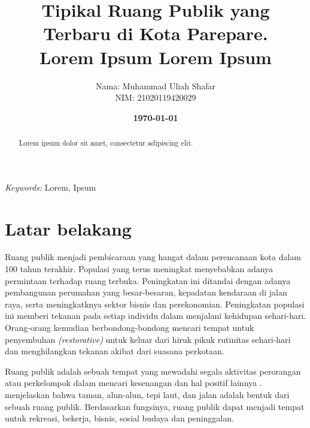\documentclass[12pt]{simart} %
\title{
\textbf{Tipikal Ruang Publik yang Terbaru di Kota Parepare.} \\
\textbf{{Lorem Ipsum Lorem Ipsum \\}}
} %
\date{\textbf{\today}}
\author{
\begin{tabular}{@{}ll@{}}
	Nama & : Muhammad Uliah Shafar\\
	NIM & : 21020119420029\\
\end{tabular}
}
\begin{document}
\maketitle %

\begin{abstract}
Lorem ipsum dolor sit amet, consectetur adipiscing elit.

\end{abstract}

\hspace*{3.6mm}\textit{Keywords:} Lorem, Ipsum %

\vspace{30pt} %


\section{Latar belakang}

Ruang publik menjadi pembicaraan yang hangat dalam perencanaan kota dalam 100 tahun terakhir. Populasi yang terus meningkat menyebabkan adanya permintaan terhadap ruang terbuka.
Peningkatan ini ditandai dengan adanya pembangunan perumahan yang besar-besaran, kepadatan kendaraan di jalan raya, serta meningkatknya sektor bisnis dan perekonomian. Peningkatan populasi ini memberi tekanan pada setiap individu dalam menjalani kehidupan sehari-hari.
Orang-orang kemudian berbondong-bondong mencari tempat untuk penyembuhan \textit{(restorative)} untuk keluar dari hiruk pikuk rutinitas sehari-hari dan menghilangkan tekanan akibat dari suasana perkotaan.

Ruang publik adalah sebuah tempat yang mewadahi segala aktivitas perorangan atau perkelompok dalam mencari kesenangan dan hal positif lainnya \citep{sadat2012}.
\cite{sadat2012} menjelaskan bahwa taman, alun-alun, tepi laut, dan jalan adalah bentuk dari sebuah ruang publik. Berdasarkan fungsinya, ruang publik dapat menjadi tempat untuk rekreasi, bekerja, bisnis, sosial budaya dan peninggalan.
\end{document}
